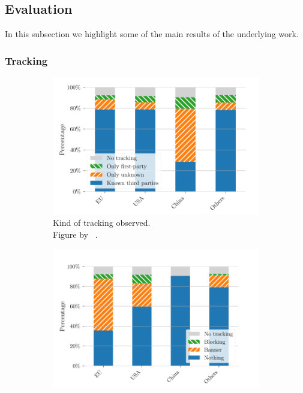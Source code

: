 \subsection{Evaluation}
\label{subsec:eval}

In this subsection we highlight some of the main results of the underlying work.

\subsubsection{Tracking}

\begin{figure}
    \centering
    \begin{subfigure}[b]{.5\textwidth}
        \centering
        \includegraphics[width=\textwidth, scale=0.27]{figures/tracking_kind_trans.png}
        \caption{Kind of tracking observed.\\Figure by \citeauthor{sanchez2019can}~\cite[Fig.~1]{sanchez2019can}.}
        \label{fig:tracking_kind}
    \end{subfigure}
    \begin{subfigure}[b]{.5\textwidth}
        \centering
        \includegraphics[width=\textwidth, scale=0.3]{figures/cookie_notice_size_trans.png}

\end{subfigure}
\end{figure}
